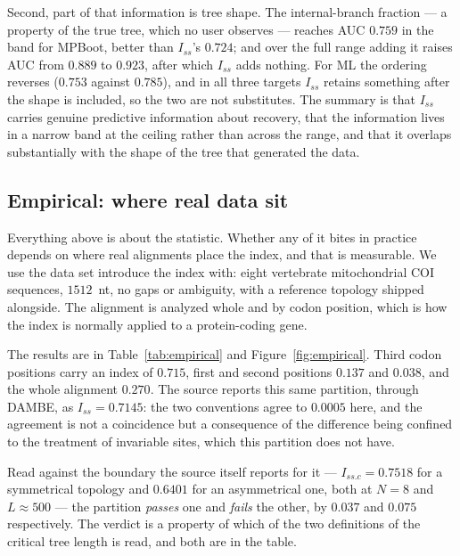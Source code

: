\documentclass[preprint,12pt,authoryear]{elsarticle}
\newcommand{\Iss}{I_{ss}}
\newcommand{\Issc}{I_{ss.c}}
\theoremstyle{definition}
\theoremstyle{remark}
\begin{document}
Second, part of that information is tree shape. The internal-branch fraction
--- a property of the true tree, which no user observes --- reaches AUC
$0.759$ in the band for MPBoot, better than $\Iss$'s $0.724$; and over the
full range adding it raises AUC from $0.889$ to $0.923$, after which $\Iss$
adds nothing. For ML the ordering reverses ($0.753$ against $0.785$), and in
all three targets $\Iss$ retains something after the shape is included, so
the two are not substitutes. The summary is that $\Iss$ carries genuine
predictive information about recovery, that the information lives in a narrow
band at the ceiling rather than across the range, and that it overlaps
substantially with the shape of the tree that generated the data.

\subsection{Empirical: where real data sit}
\label{sec:empirical}

Everything above is about the statistic. Whether any of it bites in practice
depends on where real alignments place the index, and that is measurable. We
use the data set \citet{xia2009handbook} introduce the index with:
eight vertebrate mitochondrial COI sequences, $1512$~nt, no gaps or
ambiguity, with a reference topology shipped alongside. The alignment is
analyzed whole and by codon position, which is how the index is normally
applied to a protein-coding gene.

The results are in Table~\ref{tab:empirical} and Figure~\ref{fig:empirical}.
Third codon positions carry an index of $0.715$, first and second positions
$0.137$ and $0.038$, and the whole alignment $0.270$. The source reports this
same partition, through DAMBE, as $\Iss=0.7145$: the two conventions agree to
$0.0005$ here, and the agreement is not a coincidence but a consequence of
the difference being confined to the treatment of invariable sites, which
this partition does not have.

Read against the boundary the source itself reports for it ---
$\Issc=0.7518$ for a symmetrical topology and $0.6401$ for an asymmetrical
one, both at $N=8$ and $L\approx500$ --- the partition \emph{passes} one and
\emph{fails} the other, by $0.037$ and $0.075$ respectively. The verdict is a
property of which of the two definitions of the critical tree length is
read, and both are in the table.
\end{document}
